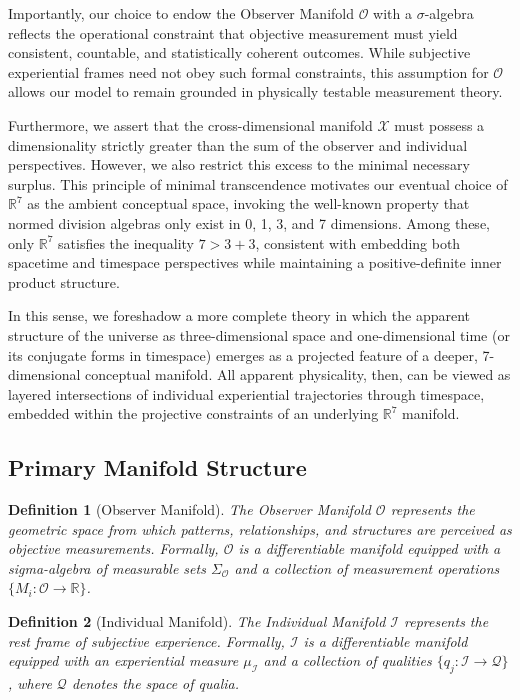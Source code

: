 \documentclass{article}
\newtheorem{definition}{Definition}
\begin{document}
Importantly, our choice to endow the Observer Manifold $\mathcal{O}$ with a $\sigma$-algebra reflects the operational constraint that objective measurement must yield consistent, countable, and statistically coherent outcomes. While subjective experiential frames need not obey such formal constraints, this assumption for $\mathcal{O}$ allows our model to remain grounded in physically testable measurement theory.

Furthermore, we assert that the cross-dimensional manifold $\mathcal{X}$ must possess a dimensionality strictly greater than the sum of the observer and individual perspectives. However, we also restrict this excess to the minimal necessary surplus. This principle of minimal transcendence motivates our eventual choice of $\mathbb{R}^7$ as the ambient conceptual space, invoking the well-known property that normed division algebras only exist in 0, 1, 3, and 7 dimensions. Among these, only $\mathbb{R}^7$ satisfies the inequality $7 > 3 + 3$, consistent with embedding both spacetime and timespace perspectives while maintaining a positive-definite inner product structure.

In this sense, we foreshadow a more complete theory in which the apparent structure of the universe as three-dimensional space and one-dimensional time (or its conjugate forms in timespace) emerges as a projected feature of a deeper, 7-dimensional conceptual manifold. All apparent physicality, then, can be viewed as layered intersections of individual experiential trajectories through timespace, embedded within the projective constraints of an underlying $\mathbb{R}^7$ manifold.

\subsection{Primary Manifold Structure}

\begin{definition}[Observer Manifold]
The Observer Manifold $\mathcal{O}$ represents the geometric space from which patterns, relationships, and structures are perceived as objective measurements. Formally, $\mathcal{O}$ is a differentiable manifold equipped with a sigma-algebra of measurable sets $\Sigma_\mathcal{O}$ and a collection of measurement operations $\{M_i: \mathcal{O} \rightarrow \mathbb{R}\}$.
\end{definition}

\begin{definition}[Individual Manifold]
The Individual Manifold $\mathcal{I}$ represents the rest frame of subjective experience. Formally, $\mathcal{I}$ is a differentiable manifold equipped with an experiential measure $\mu_\mathcal{I}$ and a collection of qualities $\{q_j: \mathcal{I} \rightarrow \mathcal{Q}\}$, where $\mathcal{Q}$ denotes the space of qualia.
\end{definition}
\end{document}
